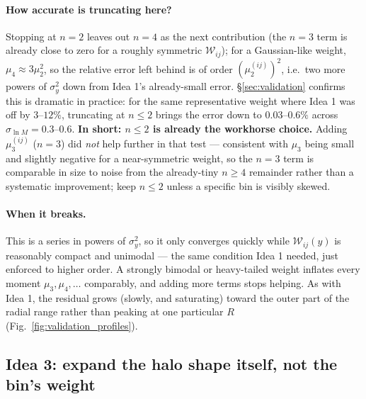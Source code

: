 \documentclass[a4paper, 11pt]{article}
\newcommand{\lnM}{\ln M}
\newcommand{\Wcal}{\mathcal{W}}
\begin{document}
\paragraph{How accurate is truncating here?} Stopping at $n=2$
leaves out $n=4$ as the next contribution (the $n=3$ term is
already close to zero for a roughly symmetric $\Wcal_{ij}$); for a
Gaussian-like weight, $\mu_4\approx3\mu_2^2$, so the relative error
left behind is of order $(\mu_2^{(ij)})^2$, i.e.\ two more powers of
$\sigma_y^2$ down from Idea 1's already-small error.
\S\ref{sec:validation} confirms this is dramatic in practice: for
the same representative weight where Idea 1 was off by $3$--$12\%$,
truncating at $n\le2$ brings the error down to
$0.03$--$0.6\%$ across $\sigma_{\lnM}=0.3$--$0.6$. \textbf{In
short: $n\le2$ is already the workhorse choice.} Adding
$\mu_3^{(ij)}$ ($n=3$) did \emph{not} help further in that test ---
consistent with $\mu_3$ being small and slightly negative for a
near-symmetric weight, so the $n=3$ term is comparable in size to
noise from the already-tiny $n\ge4$ remainder rather than a
systematic improvement; keep $n\le2$ unless a specific bin is
visibly skewed.

\paragraph{When it breaks.} This is a series in powers of
$\sigma_y^2$, so it only converges quickly while $\Wcal_{ij}(y)$ is
reasonably compact and unimodal --- the same condition Idea 1
needed, just enforced to higher order. A strongly bimodal or
heavy-tailed weight inflates every moment $\mu_3,\mu_4,\dots$
comparably, and adding more terms stops helping. As with Idea 1,
the residual grows (slowly, and saturating) toward the outer part
of the radial range rather than peaking at one particular $R$
(Fig.~\ref{fig:validation_profiles}).

\subsection{Idea 3: expand the halo shape itself, not the bin's weight}
\label{sec:approach3}
\end{document}
